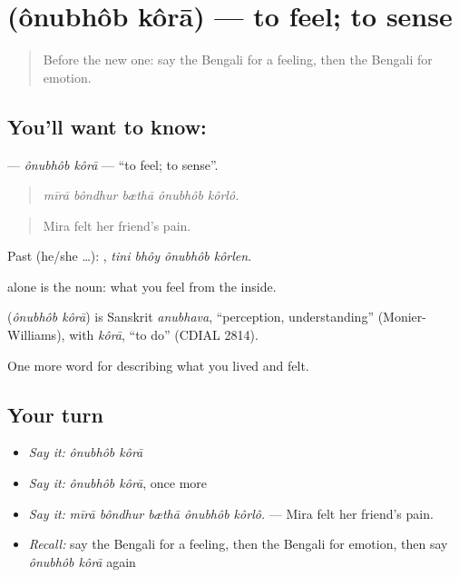 \section[\texorpdfstring{\bn{অনুভব} \bn{করা} (ônubhôb kôrā)}{অনুভব করা (ônubhôb kôrā)}]{  (ônubhôb kôrā) — to feel; to sense}

\label{lesson:BN-C438-onubhob-kora}



\begin{quote}
Before the new one: say the Bengali for a feeling, then the Bengali for emotion.
\end{quote}

\subsection*{You'll want to know:  }
\textbf{ } — \emph{ônubhôb kôrā} — \textquotedblleft{}to feel; to sense\textquotedblright{}.

\begin{quote}
    
\end{quote}

\begin{quote}
\emph{mīrā bôndhur bæthā ônubhôb kôrlô.}
\end{quote}

\begin{quote}
Mira felt her friend's pain.
\end{quote}

Past (he/she …):    , \emph{tini bhôy ônubhôb kôrlen}.

 alone is the noun: what you feel from the inside.

\begin{cousinweb}
\textbf{ } (\emph{ônubhôb kôrā}) is Sanskrit \emph{anubhava}, \textquotedblleft{}perception, understanding\textquotedblright{} (Monier-Williams), with \emph{kôrā}, \textquotedblleft{}to do\textquotedblright{} (CDIAL 2814).
\end{cousinweb}

\begin{grammarlens}[title={What you've built}]
One more word for describing what you lived and felt.
\end{grammarlens}

\subsection*{Your turn}
\begin{itemize}
\raggedright
  \item \emph{Say it:} \emph{ônubhôb kôrā}
  \item \emph{Say it:} \emph{ônubhôb kôrā}, once more
  \item \emph{Say it:} \emph{mīrā bôndhur bæthā ônubhôb kôrlô.} — Mira felt her friend's pain.
  \item \emph{Recall:} say the Bengali for a feeling, then the Bengali for emotion, then say \emph{ônubhôb kôrā} again
\end{itemize}

